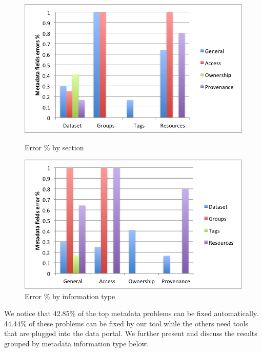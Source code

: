 \documentclass[runningheads,a4paper]{llncs}
\begin{document}
\begin{figure}

\parbox{7cm}{\hspace*{-.2in}
\includegraphics[width=.95\linewidth]{metadata_noise_by_section.png}
\captionsetup{textfont=small,singlelinecheck=off,justification=centering}
\caption{Error \% by section}
\label{fig:2}}
\qquad
\begin{minipage}{7cm}\hspace*{-.6in}
\includegraphics[width=.95\linewidth]{metadata_noise_by_metadata_type.png}
\captionsetup{textfont=small,singlelinecheck=off,justification=raggedright}
\caption{Error \% by information type}
\label{fig:3}
\end{minipage}

\end{figure}

We notice that 42.85\% of the top metadata problems can be fixed automatically. 44.44\% of these problems can be fixed by our tool while the others need tools that are plugged into the data portal. We further present and discuss the results grouped by metadata information type below.
\end{document}
